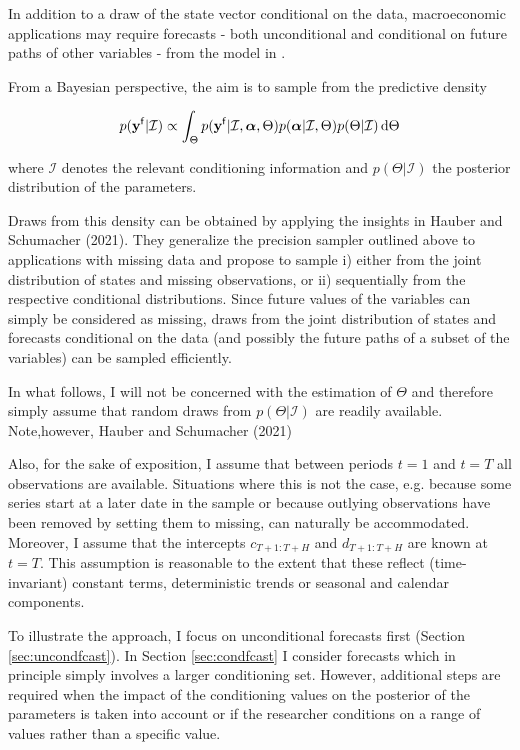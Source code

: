 \documentclass[notitlepage,a4paper,12pt]{article}
\begin{document}
In addition to a draw of the state vector conditional on the data, macroeconomic applications may require forecasts - both unconditional and conditional on future paths of other variables - from the model in . 

From a Bayesian perspective, the aim is to sample from the predictive density 

$$
p(\mathbf{y^{\sf{f}}}|\mathcal{I}) \propto \int_{\Theta} p(\mathbf{y^{\sf{f}}}|\mathcal{I}, \boldsymbol{\alpha},\Theta) p(\boldsymbol{\alpha}|\mathcal{I}, \Theta) p(\Theta|\mathcal{I})\, \text{d}\Theta
$$

where $\mathcal{I}$ denotes the relevant conditioning information and $p(\Theta|\mathcal{I})$ the posterior distribution of the parameters. 

Draws from this density can be obtained by applying the insights in Hauber and Schumacher (2021). They generalize the precision sampler outlined above to applications with missing data and propose to  sample i) either from the joint distribution of states and missing observations, or ii) sequentially from the respective conditional distributions. Since future values of the variables can simply be considered as missing, draws from the joint distribution of states and forecasts conditional on the data (and possibly the future paths of a subset of the variables) can be sampled efficiently. 

In what follows, I will not be concerned with the estimation of $\Theta$ and therefore simply assume that random draws from $p(\Theta|\mathcal{I})$ are readily available. Note,however, Hauber and Schumacher (2021) 

Also, for the sake of exposition, I assume that between periods $t=1$ and $t=T$ all observations are available. Situations where this is not the case, e.g. because some series start at a later date in the sample or because outlying observations have been removed by setting them to missing, can naturally be accommodated. Moreover, I assume that the intercepts $c_{T+1:T+H}$ and $d_{T+1:T+H}$ are known at $t=T$. This assumption is reasonable to the extent that these reflect (time-invariant) constant terms, deterministic trends or seasonal and calendar components. 

To illustrate the approach, I focus on unconditional forecasts first (Section \ref{sec:uncondfcast}). In Section \ref{sec:condfcast} I consider forecasts which in principle simply involves a larger conditioning set. However, additional steps are required when the impact of the conditioning values on the posterior of the parameters is taken into account or if the researcher conditions on a range of values rather than a specific value. 
\end{document}
